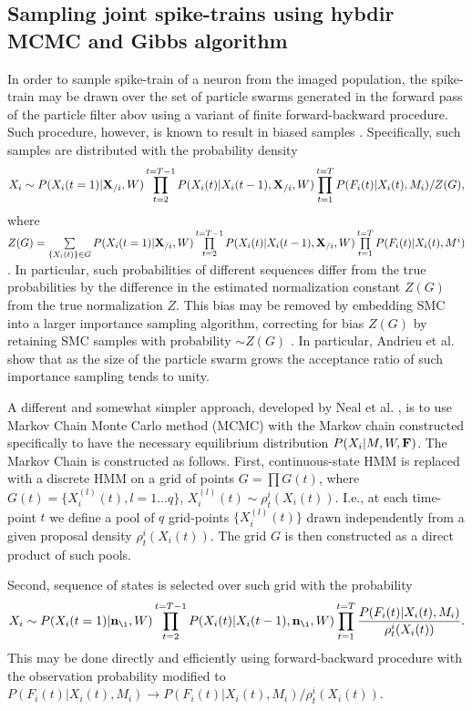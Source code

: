 \documentclass[amsmath,amssymb]{revtex4}
\begin{document}
\subsection{\label{sec:methods:sampling HMM}Sampling joint spike-trains using hybdir MCMC and Gibbs algorithm}
In order to sample spike-train of a neuron from the imaged population, the spike-train may be drawn over the set of particle swarms generated in the forward pass of the particle filter abov using a variant of finite forward-backward procedure.
Such procedure, however, is known to result in biased samples \cite{Andrieu2007,NBR03}.
Specifically, such samples are distributed with the probability density
\begin{equation}
X_i \sim P(X_i(t=1)|{\bf X}_{/i},W)\prod\limits_{t=2}^{t=T-1}P(X_i(t)|X_i(t-1),{\bf X}_{/i},W)\prod\limits_{t=1}^{t=T}P(F_i(t)|X_i(t),M_i)/Z(G),
\end{equation}
where $Z(G)=\sum\limits_{\{X_i(t)\}\in G}P(X_i(t=1)|{\bf X}_{/i},W)\prod\limits_{t=2}^{t=T-1}P(X_i(t)|X_i(t-1),{\bf X}_{/i},W) \prod\limits_{t=1}^{t=T}P(F_i(t)|X_i(t),M^i)$. 
In particular, such probabilities of different sequences differ from the true probabilities by the difference in the estimated normalization constant $Z(G)$ from the true normalization $Z$.
This bias may be removed by embedding SMC into a larger importance sampling algorithm, correcting for bias $Z(G)$ by retaining SMC samples with probability $\sim Z(G)$ \cite{Andrieu2007}. In particular, Andrieu et al. \cite{Andrieu2007} show that as the size of the particle swarm grows the acceptance ratio of such importance sampling tends to unity.

A different and somewhat simpler approach, developed by Neal et al. \cite{NBR03}, is to use Markov Chain Monte Carlo method (MCMC) with the Markov chain constructed specifically to have the necessary equilibrium distribution $P(X_i|M,W,{\bf F})$. The Markov Chain is constructed as follows. First, continuous-state HMM is replaced with a discrete HMM on a grid of points $G=\prod G(t)$, where $G(t) = \{X_i^{(l)}(t), l=1\ldots q\}$, $X_i^{(l)}(t)\sim \rho^i_t(X_i(t))$. I.e., at each time-point $t$ we define a pool of $q$ grid-points $\{X_i^{(l)}(t)\}$ drawn independently from a given proposal density $\rho^i_t(X_i(t))$. The grid $G$ is then constructed as a direct product of such pools.

Second, sequence of states is selected over such grid with the probability
\begin{equation}\label{eqn:nealprob}
X_i\sim P(X_i(t=1)|{\bf n}_{\i},W)\prod\limits_{t=2}^{t=T-1}P(X_i(t)|X_i(t-1),{\bf n}_{\i},W)\prod\limits_{t=1}^{t=T}
\frac{P(F_i(t)|X_i(t),M_i)}{\rho^i_t(X_i(t))}.
\end{equation}
This may be done directly and efficiently using forward-backward procedure with the observation probability modified to $P(F_i(t)|X_i(t),M_i)\rightarrow P(F_i(t)|X_i(t),M_i)/{\rho^i_t(X_i(t))}$.
\end{document}
